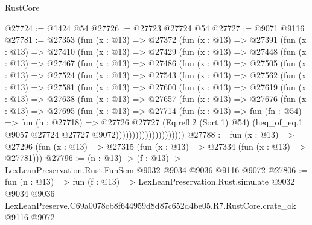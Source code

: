 \begin{lexlean}{RustCore}
\begin{coremodule}
@27724 := @1424 @54
@27726 := @27723 @27724 @54
@27727 := @9071 @9116
@27781 := @27353
    (fun (x : @13) =>
    @27372
      (fun (x : @13) =>
      @27391
        (fun (x : @13) =>
        @27410
          (fun (x : @13) =>
          @27429
            (fun (x : @13) =>
            @27448
              (fun (x : @13) =>
              @27467
                (fun (x : @13) =>
                @27486
                  (fun (x : @13) =>
                  @27505
                    (fun (x : @13) =>
                    @27524
                      (fun (x : @13) =>
                      @27543
                        (fun (x : @13) =>
                        @27562
                          (fun (x : @13) =>
                          @27581
                            (fun (x : @13) =>
                            @27600
                              (fun (x : @13) =>
                              @27619
                                (fun (x : @13) =>
                                @27638
                                  (fun (x : @13) =>
                                  @27657
                                    (fun (x : @13) =>
                                    @27676
                                      (fun (x : @13) =>
                                      @27695
                                        (fun (x : @13) =>
                                        @27714
                                          (fun (x : @13) =>
                                          fun (fn : @54) =>
                                          fun (h : @27718) =>
                                          @27726
                                            @27727
                                            (Eq.refl.{2} (Sort 1) @54)
                                            (heq_of_eq.{1}
                                              @9057
                                              @27724
                                              @27727
                                              @9072)))))))))))))))))))))
@27788 := fun (x : @13) =>
  @27296 (fun (x : @13) => @27315 (fun (x : @13) => @27334 (fun (x : @13) => @27781)))
@27796 := (n : @13) -> (f : @13) -> LexLeanPreservation.Rust.FunSem @9032 @9034 @9036 @9116 @9072
@27806 := fun (n : @13) =>
  fun (f : @13) =>
  LexLeanPreservation.Rust.simulate
    @9032
    @9034
    @9036
    LexLeanPreserve.C69a0078cb8f644959d8d87c652d4be05.R7.RustCore.crate_ok
    @9116
    @9072
\end{coremodule}
\end{lexlean}
